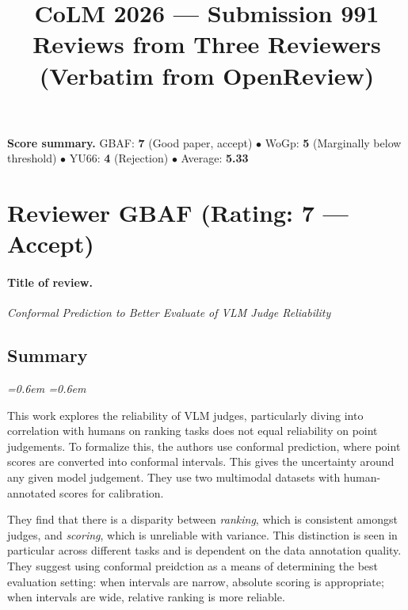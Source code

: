 \documentclass[10pt]{article}
\title{\vspace{-1.5em}CoLM 2026 --- Submission 991\\[0.2em]
       \normalsize Reviews from Three Reviewers (Verbatim from OpenReview)}
\author{}
\date{}
\newenvironment{reviewerquote}{%
  \par\addvspace{0.25ex}\begingroup
  \footnotesize\itshape
  \leftskip=0.6em \rightskip=0.6em
  \color{black!78}
  \setlength{\parskip}{0.35ex plus 0.1ex}
}{%
  \endgroup\par\addvspace{0.25ex}
}
\begin{document}
\maketitle
\vspace{-2.5em}

\noindent\textbf{Score summary.}\quad
GBAF: \textbf{7} (Good paper, accept) \quad$\bullet$\quad
WoGp: \textbf{5} (Marginally below threshold) \quad$\bullet$\quad
YU66: \textbf{4} (Rejection) \quad$\bullet$\quad
Average: \textbf{5.33}

\section{Reviewer GBAF (Rating: 7 --- Accept)}

\paragraph{Title of review.} \emph{Conformal Prediction to Better Evaluate of VLM Judge Reliability}

\subsection*{Summary}
\begin{reviewerquote}
This work explores the reliability of VLM judges, particularly diving into correlation with humans on ranking tasks does not equal reliability on point judgements. To formalize this, the authors use conformal prediction, where point scores are converted into conformal intervals. This gives the uncertainty around any given model judgement. They use two multimodal datasets with human-annotated scores for calibration.

They find that there is a disparity between \emph{ranking}, which is consistent amongst judges, and \emph{scoring}, which is unreliable with variance. This distinction is seen in particular across different tasks and is dependent on the data annotation quality. They suggest using conformal preidction as a means of determining the best evaluation setting: when intervals are narrow, absolute scoring is appropriate; when intervals are wide, relative ranking is more reliable.
\end{reviewerquote}
\end{document}
